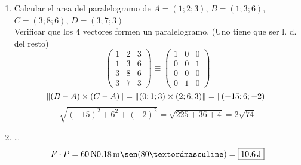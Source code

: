 \documentclass[../practica.root.tex]{subfiles}
\begin{document}
\begin{enumerate}
\begin{enumerate}
          \end{enumerate}

    \item Calcular el area del paralelogramo de $A = (1; 2; 3)$, $B = (1; 3; 6)$, $C = (3; 8; 6)$, $D = (3; 7 ;3)$ \\
          Verificar que los 4 vectores formen un paralelogramo. (Uno tiene que ser l. d. del resto) \\
          \[
              \begin{pmatrix}
                  1 & 2 & 3 \\
                  1 & 3 & 6 \\
                  3 & 8 & 6 \\
                  3 & 7 & 3
              \end{pmatrix}
              \equiv
              \begin{pmatrix}
                  1 & 0 & 0 \\
                  0 & 0 & 1 \\
                  0 & 0 & 0 \\
                  0 & 1 & 0
              \end{pmatrix}
          \]
          \[
              \|(B-A)\times(C-A)\| = \|(0; 1; 3)\times(2; 6; 3)\| = \|(-15; 6; -2)\|
          \] \[
              \sqrt{(-15)^2 + 6^2 + (-2)^2} = \sqrt{225 + 36 + 4} = \boxed{2\sqrt{74}}
          \]

    \item \dots
          \[F \cdot P = \SI{60}{\newton}\SI{0,18}{\m}\sen(80º) = \boxed{\SI{10,6}{\joule}} \]


\end{enumerate}
\end{document}
